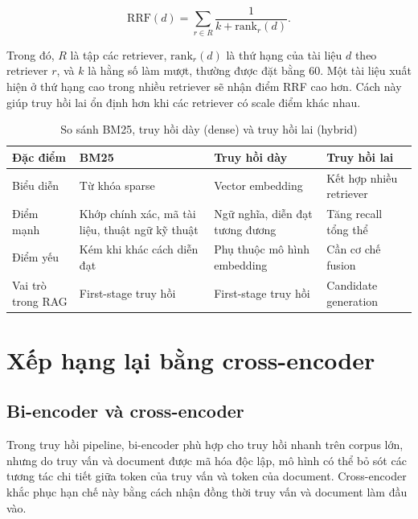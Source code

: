 \documentclass[../DoAn.tex]{subfiles}
\begin{document}
\[
\mathrm{RRF}(d)
=
\sum_{r\in R}
\frac{1}{k+\mathrm{rank}_r(d)}.
\]

Trong đó, $R$ là tập các retriever, $\mathrm{rank}_r(d)$ là thứ hạng của tài liệu $d$ theo retriever $r$, và $k$ là hằng số làm mượt, thường được đặt bằng 60. Một tài liệu xuất hiện ở thứ hạng cao trong nhiều retriever sẽ nhận điểm RRF cao hơn. Cách này giúp truy hồi lai ổn định hơn khi các retriever có scale điểm khác nhau.

\begin{table}[H]
\centering
\caption{So sánh BM25, truy hồi dày (dense) và truy hồi lai (hybrid)}
\label{tab:retrieval-comparison-bg}
{\small
\setlength{\tabcolsep}{4pt}
\begin{tabular}{|>{\raggedright\arraybackslash}p{3.3cm}|>{\raggedright\arraybackslash}p{3.6cm}|>{\raggedright\arraybackslash}p{3.8cm}|>{\raggedright\arraybackslash}p{3.8cm}|}
\hline
\textbf{Đặc điểm} & \textbf{BM25} & \textbf{Truy hồi dày} & \textbf{Truy hồi lai} \\ \hline
Biểu diễn & Từ khóa sparse & Vector embedding & Kết hợp nhiều retriever \\ \hline
Điểm mạnh & Khớp chính xác, mã tài liệu, thuật ngữ kỹ thuật & Ngữ nghĩa, diễn đạt tương đương & Tăng recall tổng thể \\ \hline
Điểm yếu & Kém khi khác cách diễn đạt & Phụ thuộc mô hình embedding & Cần cơ chế fusion \\ \hline
Vai trò trong RAG & First-stage truy hồi & First-stage truy hồi & Candidate generation \\ \hline
\end{tabular}
}
\end{table}

\section{Xếp hạng lại bằng cross-encoder}
\label{section:2.3}

\subsection{Bi-encoder và cross-encoder}
\label{subsection:2.3.1}

Trong truy hồi pipeline, bi-encoder phù hợp cho truy hồi nhanh trên corpus lớn, nhưng do truy vấn và document được mã hóa độc lập, mô hình có thể bỏ sót các tương tác chi tiết giữa token của truy vấn và token của document. Cross-encoder khắc phục hạn chế này bằng cách nhận đồng thời truy vấn và document làm đầu vào.
\end{document}
